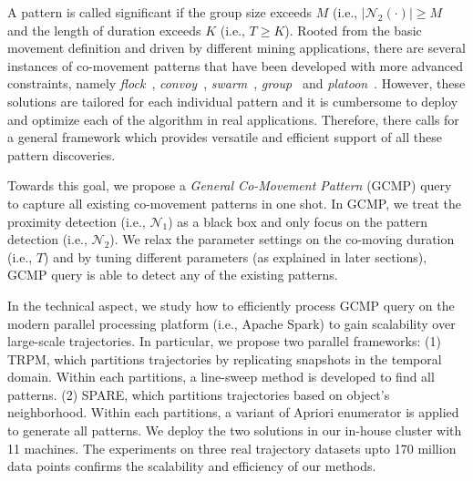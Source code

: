 A pattern is called significant if the group size exceeds $M$ (i.e., $|\mathcal{N}_2(\cdot)| \geq M$ and the length of duration exceeds $K$ (i.e., $T \geq K$). 
%
%
Rooted from the basic movement definition and driven by different mining applications, there are several instances of co-movement patterns that have been developed with more advanced constraints, namely \emph{flock}~\cite{gudmundsson2006computing}, \emph{convoy}~\cite{jeung2008discovery}, \emph{swarm}~\cite{li2010swarm}, 
\emph{group}~\cite{wang2006grouppattern} and \emph{platoon}~\cite{li2015platoon}. 
However, these solutions are tailored for each individual pattern and it is cumbersome to deploy and optimize each of the algorithm in real applications. Therefore, there 
calls for a general framework which provides versatile and efficient support of all these pattern discoveries. 


Towards this goal, we propose a \emph{General Co-Movement Pattern} (GCMP)
query to capture all existing co-movement patterns in one shot. In GCMP, we treat the proximity detection (i.e., $\mathcal{N}_1$) as
a black box and only focus on the pattern detection (i.e., $\mathcal{N}_2$). We relax the parameter settings on the
co-moving duration (i.e., $T$) and by tuning different parameters (as explained in later sections), GCMP
query is able to detect any of the existing patterns.
%



In the technical aspect, we study how to efficiently process GCMP query 
on the modern parallel processing platform (i.e., Apache Spark) to
gain scalability over large-scale trajectories. 
In particular, we propose two parallel frameworks: (1) TRPM, which partitions trajectories by replicating snapshots in the temporal domain. Within each partitions, a line-sweep method is developed to find all patterns. 
(2) SPARE, which partitions trajectories based on object's neighborhood. Within each partitions, a variant of Apriori enumerator is applied to generate all patterns. 
We deploy the two solutions in our in-house cluster with 11 machines. The experiments on three
real trajectory datasets upto 170 million data points confirms the scalability and efficiency 
of our methods.
%
